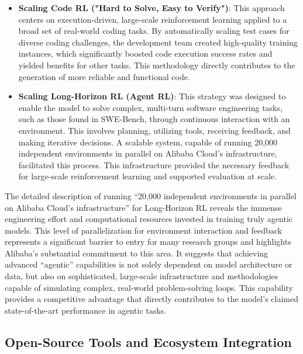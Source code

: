 \begin{itemize}
	\item \textbf{Scaling Code RL ("Hard to Solve, Easy to Verify")}: This approach centers on execution-driven, large-scale reinforcement learning applied to a broad set of real-world coding tasks. By automatically scaling test cases for diverse coding challenges, the development team created high-quality training instances, which significantly boosted code execution success rates and yielded benefits for other tasks.\cite{qwenlm_qwen3coder_blog_2025} This methodology directly contributes to the generation of more reliable and functional code.\cite{gupta_qwen3coder_medium_2025}
	\item \textbf{Scaling Long-Horizon RL (Agent RL)}: This strategy was designed to enable the model to solve complex, multi-turn software engineering tasks, such as those found in SWE-Bench, through continuous interaction with an environment. This involves planning, utilizing tools, receiving feedback, and making iterative decisions.\cite{qwenlm_qwen3coder_blog_2025, willison_qwen3coder_2025} A scalable system, capable of running 20,000 independent environments in parallel on Alibaba Cloud's infrastructure, facilitated this process. This infrastructure provided the necessary feedback for large-scale reinforcement learning and supported evaluation at scale.\cite{qwenlm_qwen3coder_blog_2025, willison_qwen3coder_2025}
\end{itemize}

The detailed description of running ``20,000 independent environments in parallel on Alibaba Cloud's infrastructure'' for Long-Horizon RL reveals the immense engineering effort and computational resources invested in training truly agentic models. This level of parallelization for environment interaction and feedback represents a significant barrier to entry for many research groups and highlights Alibaba's substantial commitment to this area. It suggests that achieving advanced ``agentic'' capabilities is not solely dependent on model architecture or data, but also on sophisticated, large-scale infrastructure and methodologies capable of simulating complex, real-world problem-solving loops. This capability provides a competitive advantage that directly contributes to the model's claimed state-of-the-art performance in agentic tasks.

\subsection{Open-Source Tools and Ecosystem Integration}


